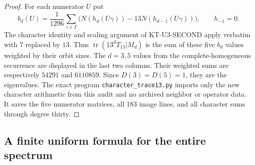 \begin{proof}
For each numerator $U$ put
\[
 b_d(U)=\frac1{1296}\sum_{\gamma\in\Gamma}
       \bigl(N(h_d(U\gamma))-13N(h_{d-1}(U\gamma))\bigr),
 \qquad h_{-1}=0.
\]
The character identity and scaling argument of KT-U3-SECOND
apply verbatim with $7$ replaced by $13$. Thus
$\operatorname{tr}(13^dT_{13}|M_d)$ is the sum of these five
$b_d$ values weighted by their orbit sizes. The $d=3,5$ values
from the complete-homogeneous recurrence are displayed in the
last two columns. Their weighted sums are respectively $54291$
and $6110859$. Since $D(3)=D(5)=1$, they are the eigenvalues.
The exact program \texttt{character\_trace13.py} imports only
the new character arithmetic from this audit and no archived
neighbor or operator data. It saves the five numerator matrices,
all 183 image lines, and all character sums through degree thirty.
\end{proof}

\subsection{A finite uniform formula for the entire spectrum}

